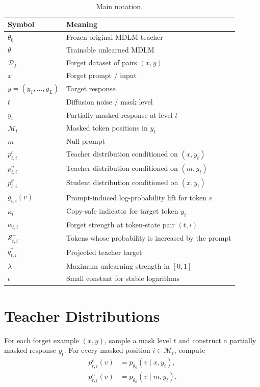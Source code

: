 \documentclass[10pt]{article}
\begin{document}
\begin{table}[h]
\centering
\small
\begin{tabular}{@{}ll@{}}
\toprule
Symbol & Meaning \\
\midrule
$\theta_0$ & Frozen original MDLM teacher \\
$\theta$ & Trainable unlearned MDLM \\
$\mathcal{D}_f$ & Forget dataset of pairs $(x,y)$ \\
$x$ & Forget prompt / input \\
$y=(y_1,\dots,y_L)$ & Target response \\
$t$ & Diffusion noise / mask level \\
$y_t$ & Partially masked response at level $t$ \\
$\mathcal{M}_t$ & Masked token positions in $y_t$ \\
$m$ & Null prompt \\
$p^c_{t,i}$ & Teacher distribution conditioned on $(x,y_t)$ \\
$p^u_{t,i}$ & Teacher distribution conditioned on $(m,y_t)$ \\
$p^\theta_{t,i}$ & Student distribution conditioned on $(x,y_t)$ \\
$g_{t,i}(v)$ & Prompt-induced log-probability lift for token $v$ \\
$\kappa_i$ & Copy-safe indicator for target token $y_i$ \\
$\alpha_{t,i}$ & Forget strength at token-state pair $(t,i)$ \\
$\mathcal{S}^{+}_{t,i}$ & Tokens whose probability is increased by the prompt \\
$q^*_{t,i}$ & Projected teacher target \\
$\lambda$ & Maximum unlearning strength in $[0,1]$ \\
$\epsilon$ & Small constant for stable logarithms \\
\bottomrule
\end{tabular}
\caption{Main notation.}
\end{table}

\section{Teacher Distributions}

For each forget example $(x,y)$, sample a mask level $t$ and construct a
partially masked response $y_t$. For every masked position $i\in\mathcal{M}_t$,
compute
\begin{align}
p^c_{t,i}(v) &= p_{\theta_0}(v\mid x,y_t),\\
p^u_{t,i}(v) &= p_{\theta_0}(v\mid m,y_t).
\end{align}
\end{document}
